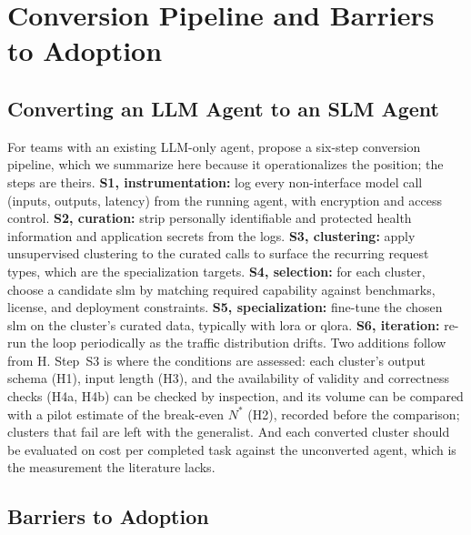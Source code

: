 
\section{Conversion Pipeline and Barriers to Adoption}
\label{supp:agentic}

\subsection{Converting an LLM Agent to an SLM Agent}
\label{subsec:agentic_conversion}

For teams with an existing LLM-only agent, \citet{belcak2025slm_agentic} propose a six-step conversion pipeline, which we summarize here because it operationalizes the position; the steps are theirs. \textbf{S1, instrumentation:} log every non-interface model call (inputs, outputs, latency) from the running agent, with encryption and access control. \textbf{S2, curation:} strip personally identifiable and protected health information and application secrets from the logs. \textbf{S3, clustering:} apply unsupervised clustering to the curated calls to surface the recurring request types, which are the specialization targets. \textbf{S4, selection:} for each cluster, choose a candidate \gls{slm} by matching required capability against benchmarks, license, and deployment constraints. \textbf{S5, specialization:} fine-tune the chosen \gls{slm} on the cluster's curated data, typically with \gls{lora} or \gls{qlora}. \textbf{S6, iteration:} re-run the loop periodically as the traffic distribution drifts. Two additions follow from H. Step~S3 is where the conditions are assessed: each cluster's output schema (H1), input length (H3), and the availability of validity and correctness checks (H4a, H4b) can be checked by inspection, and its volume can be compared with a pilot estimate of the break-even $N^{*}$ (H2), recorded before the comparison; clusters that fail are left with the generalist. And each converted cluster should be evaluated on cost per completed task against the unconverted agent, which is the measurement the literature lacks.

\subsection{Barriers to Adoption}
\label{subsec:agentic_barriers}

